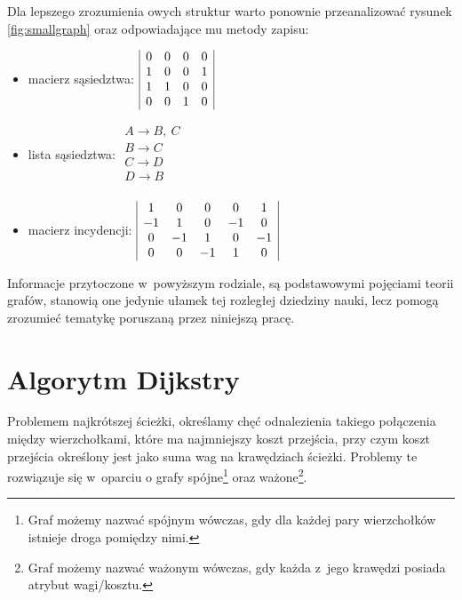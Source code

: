 \documentclass[a4paper,12pt,polish,twoside,openright]{thesis}
\begin{document}
Dla lepszego zrozumienia owych struktur warto ponownie przeanalizować rysunek \ref{fig:smallgraph}
oraz odpowiadające mu metody zapisu:
\begin{itemize}
	\item macierz sąsiedztwa:
		$\begin{array}{|c c c c|}
			0 & 0 & 0 & 0 \\
			1 & 0 & 0 & 1 \\
			1 & 1 & 0 & 0 \\
			0 & 0 & 1 & 0 \\
		\end{array}$
	\item lista sąsiedztwa:
		$\begin{array}{l}
			A \rightarrow B,~C \\
			B \rightarrow C \\
			C \rightarrow D \\
			D \rightarrow B \\
		\end{array}$
	\item macierz incydencji:
		$\begin{array}{|c c c c c|}
			1  & 0  & 0  & 0  & 1  \\
			-1 & 1  & 0  & -1 & 0  \\
			0  & -1 & 1  & 0  & -1 \\
			0  & 0  & -1 & 1  & 0  \\
		\end{array}$
\end{itemize}

Informacje przytoczone w~powyższym rodziale, są podstawowymi pojęciami teorii grafów, stanowią one jedynie ułamek tej rozległej dziedziny nauki, lecz pomogą zrozumieć tematykę poruszaną przez niniejszą pracę.

\section{Algorytm Dijkstry}
\label{chap:dijkstra_theory}
Problemem najkrótszej ścieżki, określamy chęć odnalezienia takiego połączenia między wierzchołkami, które ma najmniejszy koszt przejścia, przy czym koszt przejścia określony jest jako suma wag na krawędziach ścieżki\cite{dijkstra}.
Problemy te rozwiązuje się w~oparciu o grafy spójne\footnote{Graf możemy nazwać spójnym wówczas, gdy dla każdej pary wierzchołków istnieje droga pomiędzy nimi.} oraz ważone\footnote{Graf możemy nazwać ważonym wówczas, gdy każda z~jego krawędzi posiada atrybut wagi/kosztu.}.
\end{document}
